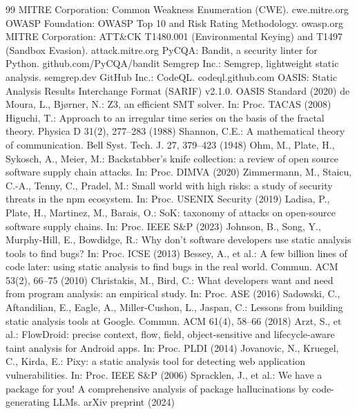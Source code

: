 \documentclass[runningheads]{llncs}
\begin{document}
\begin{thebibliography}{99}
 MITRE Corporation: Common Weakness Enumeration (CWE). cwe.mitre.org
 OWASP Foundation: OWASP Top 10 and Risk Rating Methodology. owasp.org
 MITRE Corporation: ATT\&CK T1480.001 (Environmental Keying) and T1497 (Sandbox Evasion). attack.mitre.org
 PyCQA: Bandit, a security linter for Python. github.com/PyCQA/bandit
 Semgrep Inc.: Semgrep, lightweight static analysis. semgrep.dev
 GitHub Inc.: CodeQL. codeql.github.com
 OASIS: Static Analysis Results Interchange Format (SARIF) v2.1.0. OASIS Standard (2020)
 de Moura, L., Bj\o rner, N.: Z3, an efficient SMT solver. In: Proc. TACAS (2008)
 Higuchi, T.: Approach to an irregular time series on the basis of the fractal theory. Physica D 31(2), 277--283 (1988)
 Shannon, C.E.: A mathematical theory of communication. Bell Syst. Tech. J. 27, 379--423 (1948)
 Ohm, M., Plate, H., Sykosch, A., Meier, M.: Backstabber's knife collection: a review of open source software supply chain attacks. In: Proc. DIMVA (2020)
 Zimmermann, M., Staicu, C.-A., Tenny, C., Pradel, M.: Small world with high risks: a study of security threats in the npm ecosystem. In: Proc. USENIX Security (2019)
 Ladisa, P., Plate, H., Martinez, M., Barais, O.: SoK: taxonomy of attacks on open-source software supply chains. In: Proc. IEEE S\&P (2023)
 Johnson, B., Song, Y., Murphy-Hill, E., Bowdidge, R.: Why don't software developers use static analysis tools to find bugs? In: Proc. ICSE (2013)
 Bessey, A., et al.: A few billion lines of code later: using static analysis to find bugs in the real world. Commun. ACM 53(2), 66--75 (2010)
 Christakis, M., Bird, C.: What developers want and need from program analysis: an empirical study. In: Proc. ASE (2016)
 Sadowski, C., Aftandilian, E., Eagle, A., Miller-Cushon, L., Jaspan, C.: Lessons from building static analysis tools at Google. Commun. ACM 61(4), 58--66 (2018)
 Arzt, S., et al.: FlowDroid: precise context, flow, field, object-sensitive and lifecycle-aware taint analysis for Android apps. In: Proc. PLDI (2014)
 Jovanovic, N., Kruegel, C., Kirda, E.: Pixy: a static analysis tool for detecting web application vulnerabilities. In: Proc. IEEE S\&P (2006)
 Spracklen, J., et al.: We have a package for you! A comprehensive analysis of package hallucinations by code-generating LLMs. arXiv preprint (2024)

\end{thebibliography}
\end{document}
